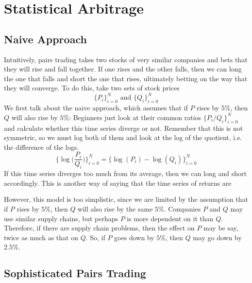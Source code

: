 \documentclass{article}
\begin{document}
\section{Statistical Arbitrage}

  \subsection{Naive Approach}

    Intuitively, pairs trading takes two stocks of very similar companies and bets that they will rise and fall together. If one rises and the other falls, then we can long the one that falls and short the one that rises, ultimately betting on the way that they will converge. To do this, take two sets of stock prices 
    \[\{P_i\}_{i=0}^N \text{ and } \{Q_i\}_{i=0}^N\]
    We first talk about the naive approach, which assumes that if $P$ rises by $5\%$, then $Q$ will also rise by $5\%$: Beginners just look at their common ratios $\{P_i / Q_i\}_{i=0}^N$ and calculate whether this time series diverge or not. Remember that this is not symmetric, so we must log both of them and look at the log of the quotient, i.e. the difference of the logs. 
    \[\Big\{ \log \Big( \frac{P_i}{Q_i} \Big) \Big\}_{i=0}^N = \{ \log(P_i) - \log(Q_i)\}_{i=0}^N \]
    If this time series diverges too much from its average, then we can long and short accordingly. This is another way of saying that the time series of returns are 

    However, this model is too simplistic, since we are limited by the assumption that if $P$ rises by $5\%$, then $Q$ will also rise by the same $5\%$. Companies $P$ and $Q$ may use similar supply chains, but perhaps $P$ is more dependent on it than $Q$. Therefore, if there are supply chain problems, then the effect on $P$ may be say, twice as much as that on $Q$. So, if $P$ goes down by $5\%$, then $Q$ may go down by $2.5\%$. 

  \subsection{Sophisticated Pairs Trading}
\end{document}
